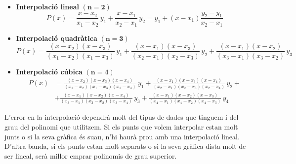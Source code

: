 \begin{itemize}
    \item \textbf{Interpolació lineal} $\boldsymbol{(n=2)}$ 
    \begin{equation}\label{eq:interp_lin}
      P(x) = \frac{x-x_2}{x_1-x_2}\, y_1 + \frac{x-x_1}{x_2-x_1}\, y_2 = y_1 + (x-x_1) \frac{y_2-y_1}{x_2-x_1}
    \end{equation}

    \item \textbf{Interpolació quadràtica} $\boldsymbol{(n=3)}$ 
    \begin{equation}
      P(x) = \frac{(x-x_2)(x-x_3)}{(x_1-x_2)(x_1-x_3)}\, y_1 + \frac{(x-x_1)(x-x_3)}{(x_2-x_1)(x_2-x_3)}\, y_2 +
      \frac{(x-x_1)(x-x_2)}{(x_3-x_1)(x_3-x_2)}\, y_3
    \end{equation}

    \item \textbf{Interpolació cúbica} $\boldsymbol{(n=4)}$ 
    \begin{equation}\begin{split}\label{eq:interp_cub}
      P(x) &= \frac{(x-x_2)(x-x_3)(x-x_4)}{(x_1-x_2)(x_1-x_3)(x_1-x_4)}\, y_1 +
              \frac{(x-x_1)(x-x_3)(x-x_4)}{(x_2-x_1)(x_2-x_3)(x_2-x_4)}\, y_2 + {} \\[1.5ex]
           &+ \frac{(x-x_1)(x-x_2)(x-x_4)}{(x_3-x_1)(x_3-x_2)(x_3-x_4)}\, y_3 +
              \frac{(x-x_1)(x-x_2)(x-x_3)}{(x_4-x_1)(x_4-x_2)(x_4-x_3)}\, y_4
    \end{split}\end{equation}
\end{itemize}


L'error en la interpolació dependrà molt del tipus de dades que tinguem i del grau del polinomi que utilitzem. Si els punts que volem interpolar estan molt junts o si la seva gràfica és suau, n'hi haurà prou amb una interpolació lineal. D'altra banda, si els punts estan molt separats o si la seva gràfica dista molt de ser lineal, serà millor emprar polinomis de grau superior.


